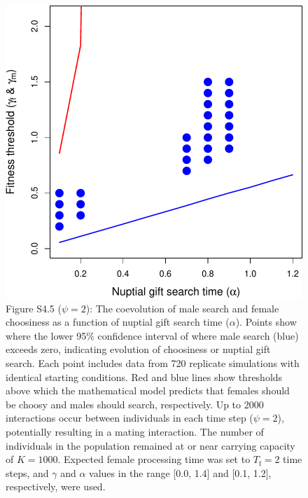 \documentclass[
]{article}
\begin{document}
\clearpage

\captionsetup{labelformat=empty}

\begin{figure}
\centering
\includegraphics{ms_refs_fixed_files/figure-latex/unnamed-chunk-10-1.pdf}
\caption{Figure S4.5 (\(\psi = 2\)): The coevolution of male search and
female choosiness as a function of nuptial gift search time
(\(\alpha\)). Points show where the lower 95\% confidence interval of
where male search (blue) exceeds zero, indicating evolution of
choosiness or nuptial gift search. Each point includes data from 720
replicate simulations with identical starting conditions. Red and blue
lines show thresholds above which the mathematical model predicts that
females should be choosy and males should search, respectively. Up to
2000 interactions occur between individuals in each time step
(\(\psi = 2\)), potentially resulting in a mating interaction. The
number of individuals in the population remained at or near carrying
capacity of \(K = 1000\). Expected female processing time was set to
\(T_{\mathrm{f}}=2\) time steps, and \(\gamma\) and \(\alpha\) values in
the range {[}0.0, 1.4{]} and {[}0.1, 1.2{]}, respectively, were used.}
\end{figure}

\captionsetup{labelformat=default}

\clearpage
\end{document}
